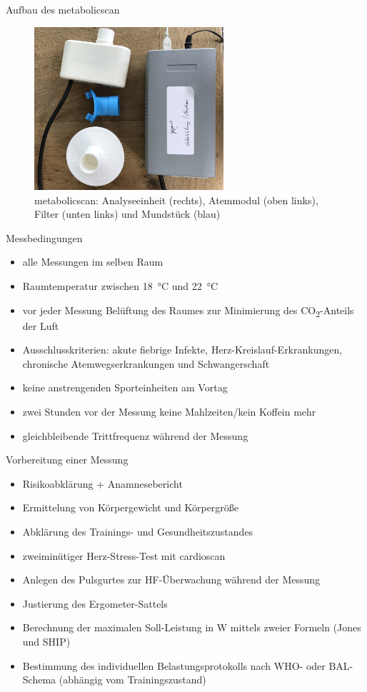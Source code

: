 \documentclass[colorBG,slideColor,9pt]{beamer}
\begin{document}
\begin{frame}{Aufbau des metabolicscan}
\begin{figure}[H]
	\centering
	\includegraphics[width=7cm]{Bilder/mbs.jpg}
	\caption{metabolicscan: Analyseeinheit (rechts), Atemmodul (oben links), Filter (unten links) und Mundstück (blau)}
\end{figure}
\end{frame}

\begin{frame}{Messbedingungen}
\begin{itemize}
	\item alle Messungen im selben Raum
	\item Raumtemperatur zwischen \SI{18}{\degreeCelsius} und \SI{22}{\degreeCelsius}
	\item vor jeder Messung Belüftung des Raumes zur Minimierung des CO\textsubscript{2}-Anteils der Luft
	\item Ausschlusskriterien: akute fiebrige Infekte, Herz-Kreislauf-Erkrankungen, chronische Atemwegserkrankungen und Schwangerschaft
	\item keine anstrengenden Sporteinheiten am Vortag
	\item zwei Stunden vor der Messung keine Mahlzeiten/kein Koffein mehr
	\item gleichbleibende Trittfrequenz während der Messung
\end{itemize}
\end{frame}

\begin{frame}{Vorbereitung einer Messung}
\begin{itemize}
	\item Risikoabklärung + Anamnesebericht
	\item Ermittelung von Körpergewicht und Körpergröße
	\item Abklärung des Trainings- und Gesundheitszustandes
	\item zweiminütiger Herz-Stress-Test mit cardioscan
	\item Anlegen des Pulsgurtes zur HF-Überwachung während der Messung
	\item Justierung des Ergometer-Sattels
	\item Berechnung der maximalen Soll-Leistung in \si{\watt} mittels zweier Formeln (Jones und SHIP)
	\item Bestimmung des individuellen Belastungsprotokolls nach WHO- oder BAL-Schema (abhängig vom Trainingszustand)
\end{itemize}
\end{frame}
\end{document}
